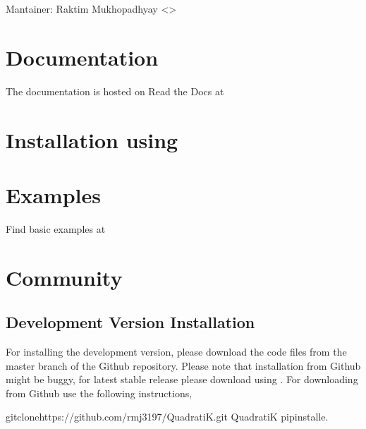 \documentclass[letterpaper,10pt,english,openany,oneside]{sphinxmanual}
\begin{document}
{{{{\sphinxAtStartPar
Mantainer: Raktim Mukhopadhyay \textless{}\textgreater{}


\section{Documentation}
\label{\detokenize{index:documentation}}
\sphinxAtStartPar
The documentation is hosted on Read the Docs at \sphinxhyphen{} 


\section{Installation using }
\label{\detokenize{index:installation-using-pip}}
\sphinxAtStartPar
{}


\section{Examples}
\label{\detokenize{index:examples}}
\sphinxAtStartPar
Find basic examples at 


\section{Community}
\label{\detokenize{index:community}}

\subsection{Development Version Installation}
\label{\detokenize{index:development-version-installation}}
\sphinxAtStartPar
For installing the development version, please download the code files from the master branch of the Github repository.
Please note that installation from Github might be buggy, for latest stable release please download using .
For downloading from Github use the following instructions,

\begin{sphinxVerbatim}[commandchars=\\\{\}]
gitclonehttps://github.com/rmj3197/QuadratiK.git
QuadratiK
pipinstall\PYGZhy{}e.
\end{sphinxVerbatim}


}}}}
\end{document}
